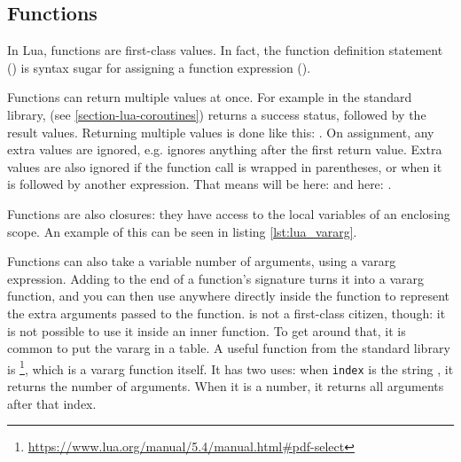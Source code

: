 \newpage
\subsection{Functions}
In Lua, functions are first-class values. In fact, the function definition statement () is syntax sugar for assigning a function expression ().

Functions can return multiple values at once. For example in the standard library,  (see \ref{section-lua-coroutines}) returns a success status, followed by the result values. Returning multiple values is done like this: . On assignment, any extra values are ignored, e.g.  ignores anything after the first return value. Extra values are also ignored if the function call is wrapped in parentheses, or when it is followed by another expression. That means  will be  here:  and here: .

Functions are also closures: they have access to the local variables of an enclosing scope. An example of this can be seen in listing \ref{lst:lua_vararg}.

Functions can also take a variable number of arguments, using a vararg expression. Adding  to the end of a function's signature turns it into a vararg function, and you can then use  anywhere directly inside the function to represent the extra arguments passed to the function.  is not a first-class citizen, though: it is not possible to use it inside an inner function. To get around that, it is common to put the vararg in a table. A useful function from the standard library is \footnote{\url{https://www.lua.org/manual/5.4/manual.html\#pdf-select}}, which is a vararg function itself. It has two uses: when \texttt{index} is the string , it returns the number of arguments. When it is a number, it returns all arguments after that index.


